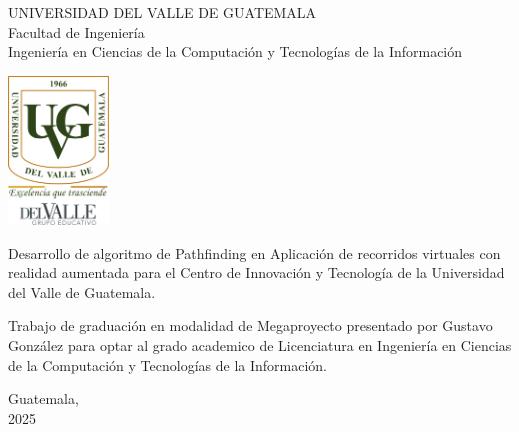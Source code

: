 \documentclass{article}
\begin{document}
\begin{center}
    \begin{doublespace}
        \thispagestyle{empty}  %
        \Large{UNIVERSIDAD DEL VALLE DE GUATEMALA}\\
        Facultad de Ingeniería \\
        Ingeniería en Ciencias de la Computación y Tecnologías de la Información 
    
        \vspace{15mm} 
        \includegraphics[width=0.2\textwidth]{images/Uvg_logo.jpg}
    
        \vspace{15mm} 
        {\Large Desarrollo de algoritmo de Pathfinding en Aplicación de recorridos virtuales con realidad aumentada para el Centro de Innovación y Tecnología de la Universidad del Valle de Guatemala.}
    
        \vspace{10mm} 
        {\Large Trabajo de graduación en modalidad de Megaproyecto presentado por Gustavo González
        para optar al grado academico de Licenciatura en Ingeniería en Ciencias de la Computación y Tecnologías de la Información.}
    
        {\Large Guatemala, \\ 2025}
        
    \end{doublespace}
    \end{center}




\setcounter{page}{1} %
\end{document}
